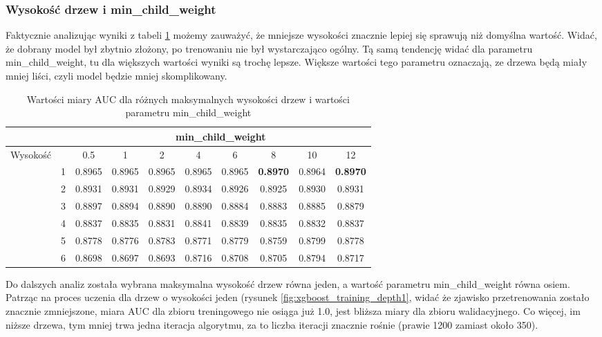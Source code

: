 \documentclass[12pt]{article}
\begin{document}
\subsubsection{Wysokość drzew i min\_child\_weight}

Faktycznie analizując wyniki z tabeli \ref{tab:xgboost_depth} możemy zauważyć, że mniejsze wysokości znacznie lepiej się sprawują niż domyślna wartość. Widać, że dobrany model był zbytnio złożony, po trenowaniu nie był wystarczająco ogólny. Tą samą tendencję widać dla parametru min\_child\_weight, tu dla większych wartości wyniki są trochę lepsze. Większe wartości tego parametru oznaczają, ze drzewa będą miały mniej liści, czyli model będzie mniej skomplikowany.

\begin{table}[h]
    \centering
    \begin{tabular}{|l|c|c|c|c|c|c|c|c|c|}
        \hline
         & &  \multicolumn{8}{c|}{min\_child\_weight}  \\ \hline
        \multirow{6}{*}{Wysokość} & & 0.5  & 1 & 2 & 4 & 6 & 8 & 10 & 12 \\ \cline{2 - 10}
        & 1 & 0.8965 & 0.8965 & 0.8965 & 0.8965 & 0.8965 & \textbf{0.8970} & 0.8964 & \textbf{0.8970} \\ \cline{2-10}
        & 2 & 0.8931 & 0.8931 & 0.8929 & 0.8934 & 0.8926 & 0.8925 & 0.8930 & 0.8931 \\ \cline{2 - 10} 
        & 3 & 0.8897 & 0.8894 & 0.8890 & 0.8890 & 0.8884 & 0.8883 & 0.8885 & 0.8879 \\ \cline{2 - 10} 
        & 4 & 0.8837 & 0.8835 & 0.8831 & 0.8841 & 0.8839 & 0.8835 & 0.8832 & 0.8837 \\ \cline{2 - 10} 
        & 5 & 0.8778 & 0.8776 & 0.8783 & 0.8771 & 0.8779 & 0.8759 & 0.8799 & 0.8778 \\ \cline{2 - 10} 
        & 6 & 0.8698 & 0.8697 & 0.8693 & 0.8716 & 0.8708 & 0.8705 & 0.8794 & 0.8717 \\ \hline

    \end{tabular}
    \caption{Wartości miary AUC dla różnych maksymalnych wysokości drzew i wartości parametru min\_child\_weight}
    \label{tab:xgboost_depth}
\end{table}

Do dalszych analiz została wybrana maksymalna wysokość drzew równa jeden, a wartość parametru min\_child\_weight równa osiem. Patrząc na proces uczenia dla drzew o wysokości jeden (rysunek \ref{fig:xgboost_training_depth1}, widać że zjawisko przetrenowania zostało znacznie zmniejszone, miara AUC dla zbioru treningowego nie osiąga już 1.0, jest bliższa miary dla zbioru walidacyjnego. Co więcej, im niższe drzewa, tym mniej trwa jedna iteracja algorytmu, za to liczba iteracji znacznie rośnie (prawie 1200 zamiast około 350). 
\end{document}
